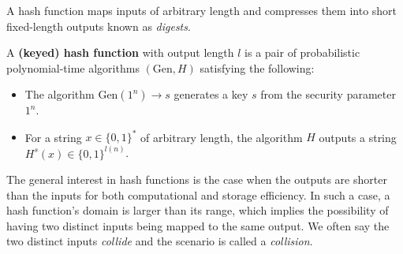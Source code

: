 \documentclass[../main.tex]{subfiles}
\begin{document}



A hash function maps inputs of arbitrary length and compresses them into short fixed-length outputs known as \emph{digests}.

\begin{definition}
A \textbf{(keyed) hash function} 
\reversemarginpar
{}
with output length $l$ is a pair of probabilistic polynomial-time algorithms $(\text{Gen},H)$ satisfying the following: 
\begin{itemize}
    \item The algorithm $\text{Gen}(1^n) \rightarrow s$ generates a key $s$ from the security parameter $1^n$.
    \item For a string $x\in \{0,1\}^*$ of arbitrary length, the algorithm $H$ outputs a string $H^s(x) \in \{0,1\}^{l(n)}$.
\end{itemize}
\end{definition}

The general interest in hash functions is the case when the outputs are shorter than the inputs for both computational and storage efficiency. In such a case,  a hash function's domain is larger than its range, which implies the possibility of having two distinct inputs being mapped to the same output. We often say the two distinct inputs \textit{collide} and the scenario is called a \textit{collision}. 
\end{document}
